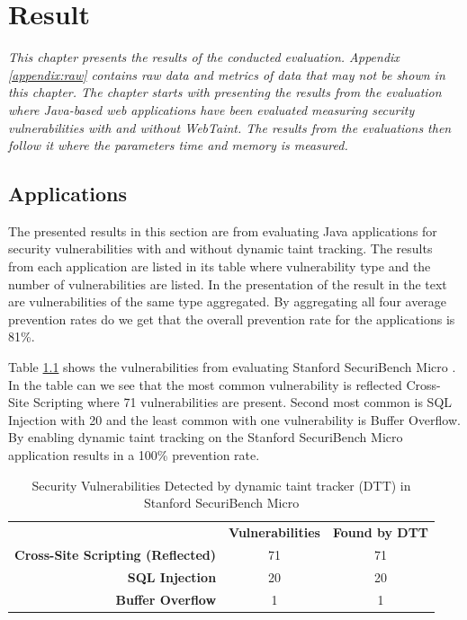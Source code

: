 \chapter{Result}
\label{Result}
\textit{This chapter presents the results of the conducted evaluation. Appendix \ref{appendix:raw} contains raw data and metrics of data that may not be shown in this chapter. The chapter starts with presenting the results from the \textit{} evaluation where Java-based web applications have been evaluated measuring security vulnerabilities with and without WebTaint. The results from the \textit{} evaluations then follow it where the parameters time and memory is measured.}



\section{Applications}
\label{Applications}
The presented results in this section are from evaluating Java applications for security vulnerabilities with and without dynamic taint tracking. The results from each application are listed in its table where vulnerability type and the number of vulnerabilities are listed. In the presentation of the result in the text are vulnerabilities of the same type aggregated. By aggregating all four average prevention rates do we get that the overall prevention rate for the applications is 81\%.

Table \ref{table:MicroTable} shows the vulnerabilities from evaluating Stanford SecuriBench Micro \parencite{securiBenchMicro}. In the table can we see that the most common vulnerability is reflected Cross-Site Scripting where 71 vulnerabilities are present. Second most common is SQL Injection with 20 and the least common with one vulnerability is Buffer Overflow. By enabling dynamic taint tracking on the Stanford SecuriBench Micro \parencite{securiBenchMicro} application results in a 100\% prevention rate.

\begin{table}[H]
  \centering
  \caption{Security Vulnerabilities Detected by dynamic taint tracker (DTT) in Stanford SecuriBench Micro}
  \label{table:MicroTable}
    \begin{tabular}{rcc}
      & \textbf{Vulnerabilities} & \textbf{Found by DTT} \\
      \textbf{Cross-Site Scripting (Reflected)} & 71            & 71  \\
      \textbf{SQL Injection}                    & 20            & 20  \\
      \textbf{Buffer Overflow}                  & 1             & 1  
    \end{tabular}
\end{table}

